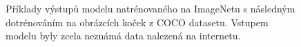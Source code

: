 \documentclass[12pt, a4paper]{article}
\begin{document}
\begin{figure}[ht!]
        \hspace{4pt}
        
        \caption{Příklady výstupů modelu natrénovaného na ImageNetu s následným dotrénováním na obrázcích koček z COCO datasetu. Vstupem modelu byly zcela neznámá data nalezená na internetu.}
        \label{fig:res_combine}
    \end{figure}
    
        
\end{document}
